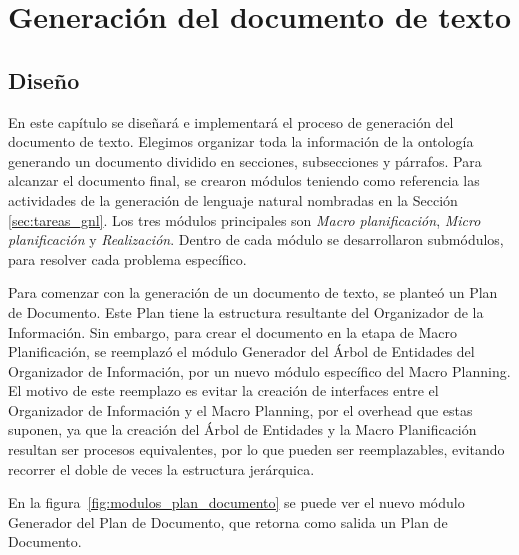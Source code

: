 \chapter{Generación del documento de texto}

\section{Diseño}
En este capítulo se diseñará e implementará el proceso de generación del documento de texto. Elegimos organizar toda la información de la ontología generando un documento dividido en secciones, subsecciones y párrafos. Para alcanzar el documento final, se crearon módulos teniendo como referencia las actividades de la generación de lenguaje natural nombradas en la Sección \ref{sec:tareas_gnl}. Los tres módulos principales son \emph{Macro planificación}, \emph{Micro planificación} y \emph{Realización}. Dentro de cada módulo se desarrollaron submódulos, para resolver cada problema específico. 

Para comenzar con la generación de un documento de texto, se planteó un Plan de Documento. Este Plan tiene la estructura resultante del Organizador de la Información. Sin embargo, para crear el documento en la etapa de Macro Planificación, se reemplazó el módulo Generador del Árbol de Entidades del Organizador de Información, por un nuevo módulo específico del Macro Planning. El motivo de este reemplazo es evitar la creación de interfaces entre el Organizador de Información y el Macro Planning, por el overhead que estas suponen, ya que la creación del Árbol de Entidades y la Macro Planificación resultan ser procesos equivalentes, por lo que pueden ser reemplazables, evitando recorrer el doble de veces la estructura jerárquica.

En la figura~\ref{fig:modulos_plan_documento} se puede ver el nuevo módulo Generador del Plan de Documento, que retorna como salida un Plan de Documento.

